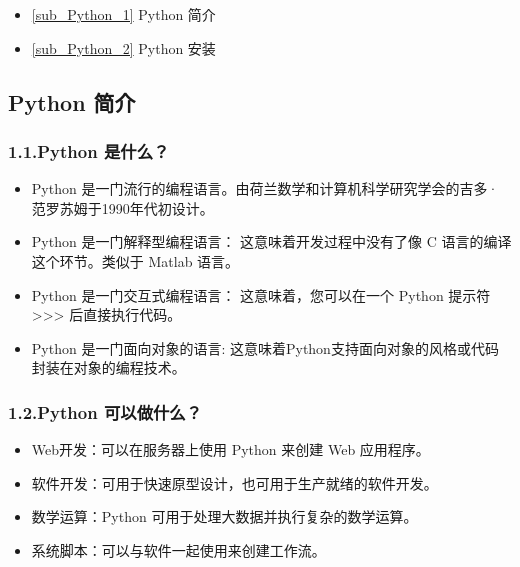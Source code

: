 
\begin{issues}
\issueAbstract
\end{issues}

\begin{itemize}
\item \autoref{sub_Python_1} Python 简介
\item \autoref{sub_Python_2} Python 安装
\end{itemize}

\subsection{Python 简介} \label{sub_Python_1}

\subsubsection{1.1.Python 是什么？}

\begin{itemize}
\item Python 是一门流行的编程语言。由荷兰数学和计算机科学研究学会的吉多·范罗苏姆于1990年代初设计。
\item Python 是一门解释型编程语言： 这意味着开发过程中没有了像 C 语言的编译这个环节。类似于 Matlab 语言。
\item Python 是一门交互式编程语言： 这意味着，您可以在一个 Python 提示符 >>> 后直接执行代码。
\item Python 是一门面向对象的语言: 这意味着Python支持面向对象的风格或代码封装在对象的编程技术。
\end{itemize}


 
\subsubsection{1.2.Python 可以做什么？}
\begin{itemize}
\item Web开发：可以在服务器上使用 Python 来创建 Web 应用程序。
\item 软件开发：可用于快速原型设计，也可用于生产就绪的软件开发。
\item 数学运算：Python 可用于处理大数据并执行复杂的数学运算。
\item 系统脚本：可以与软件一起使用来创建工作流。
\end{itemize}

